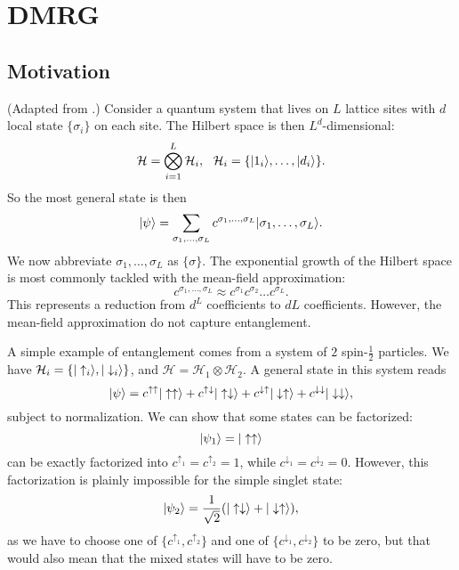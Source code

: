 \documentclass{article}
\begin{document}
\begin{theorem}[Uniqueness]
    
\end{theorem}

\section{DMRG}
\subsection{Motivation}
(Adapted from \cite[Ch. 16]{pavariniEmergentPhenomenaCorrelated2013}.) Consider a quantum system that lives on $L$ lattice sites with $d$ local state $\{\sigma_i\}$ on each site. The Hilbert space is then $L^d$-dimensional:
\begin{equation}
    \mathcal{H}=\bigotimes_{i=1}^L\mathcal{H}_i,\ \ \mathcal{H}_i=\{|1_i\ket,\dots,|d_i\ket\}.
\end{equation}
So the most general state is then
\begin{equation}
    |\psi\rangle=\sum_{\sigma_1,\dots,\sigma_L}c^{\sigma_1,\dots,\sigma_L}|{\sigma_1,\dots,\sigma_L}\rangle.
\end{equation}
We now abbreviate ${\sigma_1,\dots,\sigma_L}$ as $\{\sigma\}$. The exponential growth of the Hilbert space is most commonly tackled with the mean-field approximation:
\begin{equation}
\label{eq:meanfield-tensor}
    c^{\sigma_1,\dots,\sigma_L}\approx c^{\sigma_1}c^{\sigma_2}\dots c^{\sigma_L}.
\end{equation}
This represents a reduction from $d^L$ coefficients to $dL$ coefficients. However, the mean-field approximation do not capture entanglement.
\begin{example}[Entanglement]
    A simple example of entanglement comes from a system of $2$ spin-$\frac{1}{2}$ particles. We have $\mathcal{H}_i=\{|\uparrow_i\rangle,|\downarrow_i\rangle\}$, and $\mathcal{H}=\mathcal{H}_1\otimes\mathcal{H}_2$. A general state in this system reads
    \begin{equation}
        |\psi\rangle=c^{\uparrow\uparrow}|\uparrow\uparrow\rangle+c^{\uparrow\downarrow}|\uparrow\downarrow\rangle+c^{\downarrow\uparrow}|\downarrow\uparrow\rangle+c^{\downarrow\downarrow}|\downarrow\downarrow\rangle,
    \end{equation}
    subject to normalization. We can show that some states can be factorized:
    \begin{equation}
        |\psi_1\rangle=|\uparrow\uparrow\rangle
    \end{equation}
    can be exactly factorized into $c^{\uparrow_1}=c^{\uparrow_2}=1$, while $c^{\downarrow_1}=c^{\downarrow_2}=0$. However, this factorization is plainly impossible for the simple singlet state:
    \begin{equation}
        |\psi_2\rangle=\frac{1}{\sqrt{2}}(|\uparrow\downarrow\rangle+|\downarrow\uparrow\rangle),
    \end{equation}
    as we have to choose one of $\{c^{\uparrow_1},c^{\uparrow_2}\}$ and one of $\{c^{\downarrow_1},c^{\downarrow_2}\}$ to be zero, but that would also mean that the mixed states will have to be zero.
\end{example}
\end{document}
